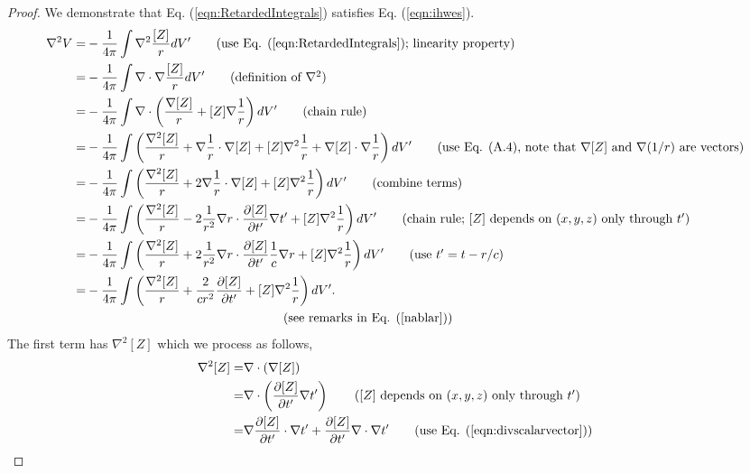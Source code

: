 \documentclass[11pt]{article}              %
\begin{document}
\begin{proof}
We demonstrate that Eq. (\ref{eqn:RetardedIntegrals}) satisfies Eq. (\ref{eqn:ihwes}).
\begin{align}
    \nabla^2 V=&-\frac{1}{4\pi}\int\nabla^2\frac{[Z]}{r}dV^\prime\tag{use Eq. (\ref{eqn:RetardedIntegrals}); linearity property}\\
    =&-\frac{1}{4\pi}\int\nabla\cdot\nabla\frac{[Z]}{r}dV^\prime\tag{definition of $\nabla^2$}\\
    =&-\frac{1}{4\pi}\int \nabla\cdot\left(\frac{\nabla{[Z]}}{r}+{[Z]}\nabla\frac{1}{r}\right)dV^\prime\tag{chain rule}\\
    =&-\frac{1}{4\pi}\int \left(\frac{\nabla^2 [Z]}{r}+\nabla\frac{1}{r}\cdot \nabla [Z]+[Z]\nabla^2 \frac{1}{r}+\nabla [Z]\cdot \nabla \frac{1}{r}\right)dV^\prime\tag{use Eq. (A.4), note that $\nabla[Z]$ and $\nabla(1/r)$ are vectors}\\
    =&-\frac{1}{4\pi}\int \left(\frac{\nabla^2 [Z]}{r}+2\nabla\frac{1}{r}\cdot \nabla [Z]+[Z]\nabla^2 \frac{1}{r}\right)dV^\prime\tag{combine terms}\\
    =&-\frac{1}{4\pi}\int \left(\frac{\nabla^2 [Z]}{r}-2\frac{1}{r^2}\nabla r\cdot\frac{\partial [Z]}{\partial t^\prime}\nabla t^\prime+[Z]\nabla^2 \frac{1}{r}\right)dV^\prime\tag{chain rule; $[Z]$ depends on $(x,y,z)$ only through $t^\prime$}\\
    =&-\frac{1}{4\pi}\int \left(\frac{\nabla^2 [Z]}{r}+2\frac{1}{r^2}\nabla r\cdot\frac{\partial [Z]}{\partial t^\prime}\frac{1}{c}\nabla r+[Z]\nabla^2 \frac{1}{r}\right)dV^\prime\tag{use $t^\prime=t-r/c$}\\
    =&-\frac{1}{4\pi}\int \left(\frac{\nabla^2 [Z]}{r}+\frac{2}{cr^2}\frac{\partial [Z]}{\partial t^\prime}+[Z]\nabla^2 \frac{1}{r}\right)dV^\prime. \notag\\
    &\ \ \ \ \ \ \ \ \ \ \ \ \ \ \ \ \ \ \ \ \ \ \ \ \ \ \ \ \ \ \ \ \ \ \ \ \ \ \ \ \ \ \ \ \ \ \ \mbox{(see remarks in Eq. (\ref{nablar}))}\label{eqnlaplacian}
\end{align}
The first term has $\nabla^2[Z]$ which we process as follows,
\begin{align}
    \nabla^2 [Z]=&\nabla\cdot(\nabla [Z])\notag\\
    =&\nabla\cdot\left(\frac{\partial [Z]}{\partial t^\prime}\nabla t^\prime\right)\tag{$[Z]$ depends on $(x,y,z)$ only through $t^\prime$}\\
    =&\nabla\frac{\partial [Z]}{\partial t^\prime}\cdot\nabla t^\prime+\frac{\partial [Z]}{\partial t^\prime}\nabla\cdot\nabla t^\prime\tag{use Eq. (\ref{eqn:divscalarvector})}\\

\end{align}
\end{proof}
\end{document}
